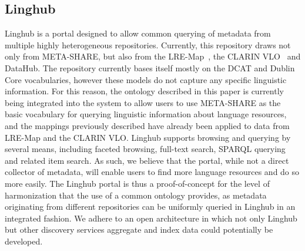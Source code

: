 \documentclass{llncs}
\begin{document}
\subsection{Linghub}

Linghub is a portal designed to allow common querying of metadata from multiple
highly heterogeneous repositories. Currently, this repository draws not only
from META-SHARE, but also from the LRE-Map~\cite{calzolari2012lre}, the CLARIN
VLO~\cite{broeder2010data} and DataHub. The repository currently bases itself
mostly on the DCAT and Dublin Core vocabularies, however these models do not capture
any specific linguistic information. For this reason, the ontology described in this paper is currently being integrated into the system to allow users to use META-SHARE as the
basic vocabulary for querying linguistic information about language resources, and the mappings previously
described have already been applied to data from LRE-Map and the CLARIN VLO.
Linghub supports browsing and querying by several means, including faceted
browsing, full-text search, SPARQL querying and related item search. As such, we
believe that the portal, while not a direct collector of metadata, will enable
users to find more language resources and do so more easily.
The Linghub portal is thus a proof-of-concept for the level of
harmonization that the use of a common ontology provides, as metadata
originating from different repositories can be uniformly queried in Linghub in
an integrated fashion. We adhere to an open architecture in which not only
Linghub but other discovery services aggregate and index data could potentially
be developed.
\end{document}
